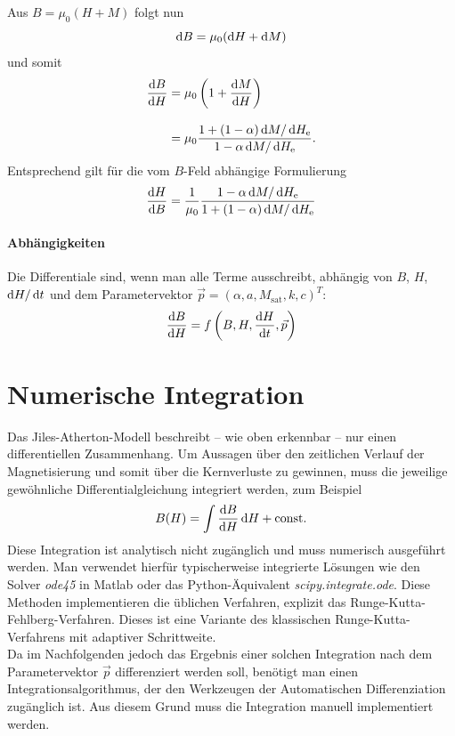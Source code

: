 \documentclass{scrartcl}
\newcommand{\He}{H_\text{e}}
\newcommand{\Msat}{M_\text{sat}}
\begin{document}
Aus $B = \mu_0(H + M)$ folgt nun
\begin{equation}
	\mathop{}\!\mathrm{d} B = \mu_0 (\mathop{}\!\mathrm{d} H + \mathop{}\!\mathrm{d} M)
\end{equation}
und somit
\begin{equation}
\begin{aligned}
	\frac{\dif B}{\dif H} &= \mu_0 \left(1 + \frac{\dif M}{\dif H}\right)\\[0.3cm]
	&= \mu_0 \frac{1 + (1-\alpha)\dif M/\dif \He}{1 - \alpha \dif M/\dif \He}. \label{eq:dB_dH}
\end{aligned}
\end{equation}\vspace{0.3cm}
Entsprechend gilt für die vom $B$-Feld abhängige Formulierung
\begin{equation}
	\frac{\dif H}{\dif B} = \frac{1}{\mu_0} \frac{1 - \alpha \dif M/\dif \He}{1 + (1-\alpha)\dif M/\dif \He}
\end{equation}
\paragraph{Abhängigkeiten}
Die Differentiale sind, wenn man alle Terme ausschreibt, abhängig von $B$, $H$, $\mathop{}\!\mathrm{d} H/\mathop{}\!\mathrm{d} t$ und dem Parametervektor $\vec{p} = (\alpha, a, \Msat, k, c)^T$:
\begin{equation}
	\frac{\mathop{}\!\mathrm{d} B}{\mathop{}\!\mathrm{d} H} = f\left(B, H, \frac{\mathop{}\!\mathrm{d} H}{\mathop{}\!\mathrm{d} t}, \vec p \right)
\end{equation}
\section{Numerische Integration}
\label{sec:numeric-integration}
Das Jiles-Atherton-Modell beschreibt -- wie oben erkennbar -- nur einen differentiellen Zusammenhang. Um Aussagen über den zeitlichen Verlauf der Magnetisierung und somit über die Kernverluste zu gewinnen, muss die jeweilige gewöhnliche Differentialgleichung integriert werden, zum Beispiel
\begin{equation}
B(H) = \int \frac{\mathop{}\!\mathrm{d} B}{\mathop{}\!\mathrm{d} H}\mathop{}\!\mathrm{d} H + \text{const.}
\end{equation}
Diese Integration ist analytisch nicht zugänglich und muss numerisch ausgeführt werden. Man verwendet hierfür typischerweise integrierte Lösungen wie den Solver \emph{ode45} in Matlab oder das Python-Äquivalent \emph{scipy.integrate.ode}. Diese Methoden implementieren die üblichen Verfahren, explizit das Runge-Kutta-Fehlberg-Verfahren. Dieses ist eine Variante des klassischen Runge-Kutta-Verfahrens mit adaptiver Schrittweite.\\
Da im Nachfolgenden jedoch das Ergebnis einer solchen Integration nach dem Parametervektor $\vec p$ differenziert werden soll, benötigt man einen Integrationsalgorithmus, der den Werkzeugen der Automatischen Differenziation zugänglich ist. Aus diesem Grund muss die Integration manuell implementiert werden.
\end{document}
